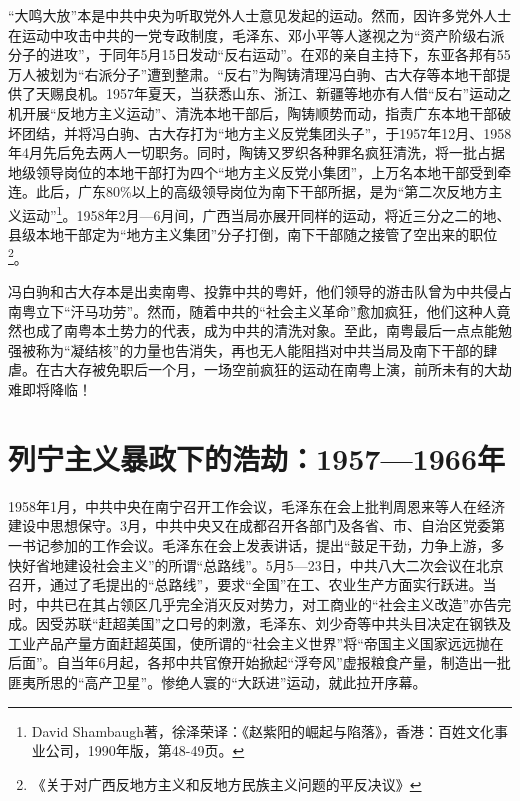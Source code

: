 “大鸣大放”本是中共中央为听取党外人士意见发起的运动。然而，因许多党外人士在运动中攻击中共的一党专政制度，毛泽东、邓小平等人遂视之为“资产阶级右派分子的进攻”，于同年5月15日发动“反右运动”。在邓的亲自主持下，东亚各邦有55万人被划为“右派分子”遭到整肃。“反右”为陶铸清理冯白驹、古大存等本地干部提供了天赐良机。1957年夏天，当获悉山东、浙江、新疆等地亦有人借“反右”运动之机开展“反地方主义运动”、清洗本地干部后，陶铸顺势而动，指责广东本地干部破坏团结，并将冯白驹、古大存打为“地方主义反党集团头子”，于1957年12月、1958年4月先后免去两人一切职务。同时，陶铸又罗织各种罪名疯狂清洗，将一批占据地级领导岗位的本地干部打为四个“地方主义反党小集团”，上万名本地干部受到牵连。此后，广东80\%以上的高级领导岗位为南下干部所据，是为“第二次反地方主义运动”\footnote{David Shambaugh著，徐泽荣译：《赵紫阳的崛起与陷落》，香港：百姓文化事业公司，1990年版，第48-49页。}。1958年2月—6月间，广西当局亦展开同样的运动，将近三分之二的地、县级本地干部定为“地方主义集团”分子打倒，南下干部随之接管了空出来的职位\footnote{《关于对广西反地方主义和反地方民族主义问题的平反决议》}。

冯白驹和古大存本是出卖南粤、投靠中共的粤奸，他们领导的游击队曾为中共侵占南粤立下“汗马功劳”。然而，随着中共的“社会主义革命”愈加疯狂，他们这种人竟然也成了南粤本土势力的代表，成为中共的清洗对象。至此，南粤最后一点点能勉强被称为“凝结核”的力量也告消失，再也无人能阻挡对中共当局及南下干部的肆虐。在古大存被免职后一个月，一场空前疯狂的运动在南粤上演，前所未有的大劫难即将降临！

\section{列宁主义暴政下的浩劫：1957—1966年}

\indent 1958年1月，中共中央在南宁召开工作会议，毛泽东在会上批判周恩来等人在经济建设中思想保守。3月，中共中央又在成都召开各部门及各省、市、自治区党委第一书记参加的工作会议。毛泽东在会上发表讲话，提出“鼓足干劲，力争上游，多快好省地建设社会主义”的所谓“总路线”。5月5—23日，中共八大二次会议在北京召开，通过了毛提出的“总路线”，要求“全国”在工、农业生产方面实行跃进。当时，中共已在其占领区几乎完全消灭反对势力，对工商业的“社会主义改造”亦告完成。因受苏联“赶超美国”之口号的刺激，毛泽东、刘少奇等中共头目决定在钢铁及工业产品产量方面赶超英国，使所谓的“社会主义世界”将“帝国主义国家远远抛在后面”。自当年6月起，各邦中共官僚开始掀起“浮夸风”虚报粮食产量，制造出一批匪夷所思的“高产卫星”。惨绝人寰的“大跃进”运动，就此拉开序幕。

